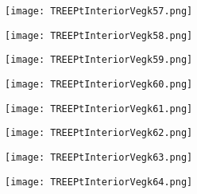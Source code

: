 \documentclass[pdf]{beamer}
\begin{document}
\begin{frame}
\begin{figure}[!h]
\centering
\texttt{[image: TREEPtInteriorVegk57.png]}
\end{figure}
\end{frame}

\begin{frame}
\begin{figure}[!h]
\centering
\texttt{[image: TREEPtInteriorVegk58.png]}
\end{figure}
\end{frame}

\begin{frame}
\begin{figure}[!h]
\centering
\texttt{[image: TREEPtInteriorVegk59.png]}
\end{figure}
\end{frame}

\begin{frame}
\begin{figure}[!h]
\centering
\texttt{[image: TREEPtInteriorVegk60.png]}
\end{figure}
\end{frame}

\begin{frame}
\begin{figure}[!h]
\centering
\texttt{[image: TREEPtInteriorVegk61.png]}
\end{figure}
\end{frame}

\begin{frame}
\begin{figure}[!h]
\centering
\texttt{[image: TREEPtInteriorVegk62.png]}
\end{figure}
\end{frame}

\begin{frame}
\begin{figure}[!h]
\centering
\texttt{[image: TREEPtInteriorVegk63.png]}
\end{figure}
\end{frame}

\begin{frame}
\begin{figure}[!h]
\centering
\texttt{[image: TREEPtInteriorVegk64.png]}
\end{figure}
\end{frame}
\end{document}
